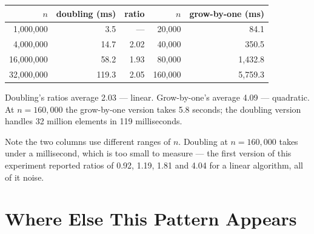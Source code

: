 \begin{worked}
\begin{center}
\begin{tabular}{@{}rrr|rr@{}}
\toprule
\rowcolor{primary!15}
$n$ & doubling (ms) & ratio & $n$ & grow-by-one (ms) \\
\midrule
 1{,}000{,}000 &   3.5 & ---  &  20{,}000 &    84.1 \\
 4{,}000{,}000 &  14.7 & 2.02 &  40{,}000 &   350.5 \\
16{,}000{,}000 &  58.2 & 1.93 &  80{,}000 & 1{,}432.8 \\
32{,}000{,}000 & 119.3 & 2.05 & 160{,}000 & 5{,}759.3 \\
\bottomrule
\end{tabular}
\end{center}

\smallskip
Doubling's ratios average 2.03 --- linear. Grow-by-one's average 4.09 ---
quadratic. At $n = 160{,}000$ the grow-by-one version takes 5.8 seconds; the
doubling version handles 32 million elements in 119 milliseconds.

\smallskip
Note the two columns use different ranges of $n$. Doubling at $n = 160{,}000$
takes under a millisecond, which is too small to measure --- the first version
of this experiment reported ratios of 0.92, 1.19, 1.81 and 4.04 for a linear
algorithm, all of it noise.
\end{worked}

\section{Where Else This Pattern Appears}

